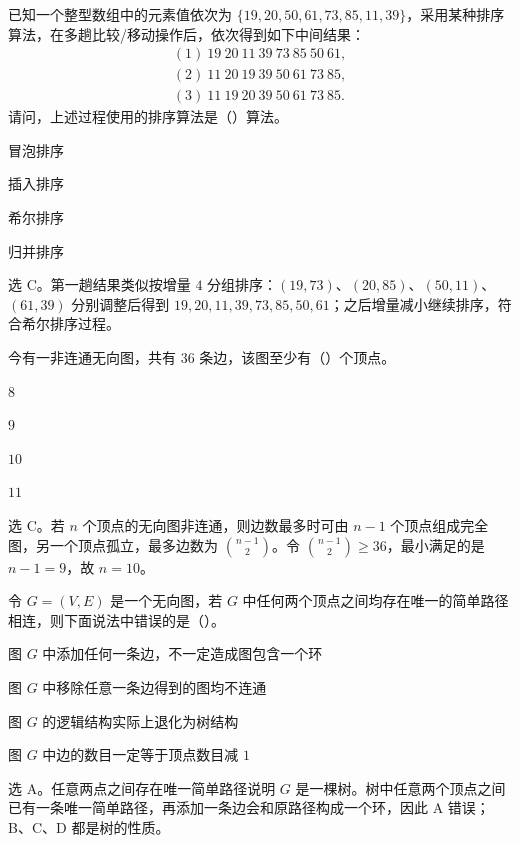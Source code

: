 \begin{question}
已知一个整型数组中的元素值依次为 $\{19,20,50,61,73,85,11,39\}$，采用某种排序算法，在多趟比较/移动操作后，依次得到如下中间结果：
\[
\begin{array}{l}
(1)\ 19\ 20\ 11\ 39\ 73\ 85\ 50\ 61,\\
(2)\ 11\ 20\ 19\ 39\ 50\ 61\ 73\ 85,\\
(3)\ 11\ 19\ 20\ 39\ 50\ 61\ 73\ 85.
\end{array}
\]
请问，上述过程使用的排序算法是（\quad）算法。
\begin{choiceoptions}[4]
  \item 冒泡排序
  \item 插入排序
  \item 希尔排序
  \item 归并排序
\end{choiceoptions}
\begin{solution}
选 C。第一趟结果类似按增量 $4$ 分组排序：$(19,73)$、$(20,85)$、$(50,11)$、$(61,39)$ 分别调整后得到 $19,20,11,39,73,85,50,61$；之后增量减小继续排序，符合希尔排序过程。
\end{solution}
\end{question}

\begin{question}
今有一非连通无向图，共有 $36$ 条边，该图至少有（\quad）个顶点。
\begin{choiceoptions}[4]
  \item $8$
  \item $9$
  \item $10$
  \item $11$
\end{choiceoptions}
\begin{solution}
选 C。若 $n$ 个顶点的无向图非连通，则边数最多时可由 $n-1$ 个顶点组成完全图，另一个顶点孤立，最多边数为 $\binom{n-1}{2}$。令 $\binom{n-1}{2}\ge 36$，最小满足的是 $n-1=9$，故 $n=10$。
\end{solution}
\end{question}

\begin{question}
令 $G=(V,E)$ 是一个无向图，若 $G$ 中任何两个顶点之间均存在唯一的简单路径相连，则下面说法中错误的是（\quad）。
\begin{choiceoptions}[1]
  \item 图 $G$ 中添加任何一条边，不一定造成图包含一个环
  \item 图 $G$ 中移除任意一条边得到的图均不连通
  \item 图 $G$ 的逻辑结构实际上退化为树结构
  \item 图 $G$ 中边的数目一定等于顶点数目减 $1$
\end{choiceoptions}
\begin{solution}
选 A。任意两点之间存在唯一简单路径说明 $G$ 是一棵树。树中任意两个顶点之间已有一条唯一简单路径，再添加一条边会和原路径构成一个环，因此 A 错误；B、C、D 都是树的性质。
\end{solution}
\end{question}

